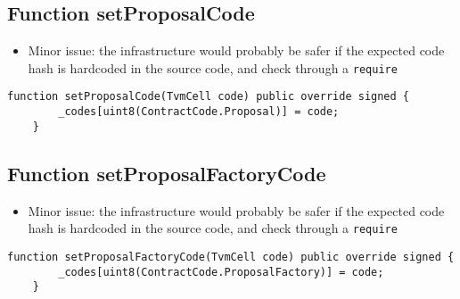 \subsection{Function setProposalCode}

\begin{itemize}
\item Minor issue: the infrastructure would probably be safer if the
  expected code hash is hardcoded in the source code, and check
  through a {\tt require}
\end{itemize}

\begin{lstlisting}[firstnumber=16]
    function setProposalCode(TvmCell code) public override signed {
        _codes[uint8(ContractCode.Proposal)] = code;
    }
\end{lstlisting}

\subsection{Function setProposalFactoryCode}

\begin{itemize}
\item Minor issue: the infrastructure would probably be safer if the
  expected code hash is hardcoded in the source code, and check
  through a {\tt require}
\end{itemize}

\begin{lstlisting}[firstnumber=22]
    function setProposalFactoryCode(TvmCell code) public override signed {
        _codes[uint8(ContractCode.ProposalFactory)] = code;
    }
\end{lstlisting}

